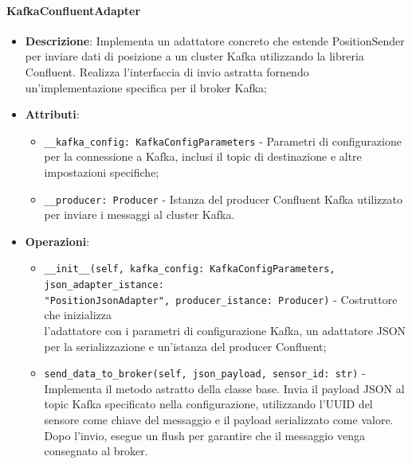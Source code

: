 \documentclass[10pt]{article}
\begin{document}
    \paragraph{KafkaConfluentAdapter}
    \begin{itemize} 
    \item \textbf{Descrizione}: Implementa un adattatore concreto che estende PositionSender per inviare dati di posizione a un cluster Kafka utilizzando la libreria Confluent. Realizza l'interfaccia di invio astratta fornendo un'implementazione specifica per il broker Kafka;
    \item \textbf{Attributi}:
    \begin{itemize}
        \item \texttt{\_\_kafka\_config: KafkaConfigParameters} - Parametri di configurazione per la connessione a Kafka, inclusi il topic di destinazione e altre impostazioni specifiche;
        \item \texttt{\_\_producer: Producer} - Istanza del producer Confluent Kafka utilizzato per inviare i messaggi al cluster Kafka.
    \end{itemize}
    
    \item \textbf{Operazioni}:
    \begin{itemize}
        \item \texttt{\_\_init\_\_(self, kafka\_config: KafkaConfigParameters, json\_adapter\_istance: \\"PositionJsonAdapter", producer\_istance: Producer)} - Costruttore che inizializza\\ l'adattatore con i parametri di configurazione Kafka, un adattatore JSON per la serializzazione e un'istanza del producer Confluent;
        
        \item \texttt{send\_data\_to\_broker(self, json\_payload, sensor\_id: str)} - Implementa il metodo astratto della classe base. Invia il payload JSON al topic Kafka specificato nella configurazione, utilizzando l'UUID del sensore come chiave del messaggio e il payload serializzato come valore. Dopo l'invio, esegue un flush per garantire che il messaggio venga consegnato al broker.
    \end{itemize}
    \end{itemize}
\end{document}
